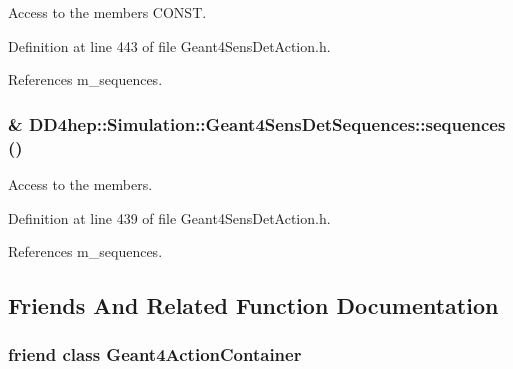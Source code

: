 Access to the members CONST. 

Definition at line 443 of file Geant4SensDetAction.h.

References m\_\-sequences.\hypertarget{class_d_d4hep_1_1_simulation_1_1_geant4_sens_det_sequences_a40e7646be1758328d5bf58213b320bf9}{
\subsubsection[{sequences}]{\& DD4hep::Simulation::Geant4SensDetSequences::sequences ()}}
\label{class_d_d4hep_1_1_simulation_1_1_geant4_sens_det_sequences_a40e7646be1758328d5bf58213b320bf9}


Access to the members. 

Definition at line 439 of file Geant4SensDetAction.h.

References m\_\-sequences.

\subsection{Friends And Related Function Documentation}
\hypertarget{class_d_d4hep_1_1_simulation_1_1_geant4_sens_det_sequences_a17a3e017d1d61a4f615d4e8eef0f98cb}{
\subsubsection[{Geant4ActionContainer}]{\setlength{\rightskip}{0pt plus 5cm}friend class {\bf Geant4ActionContainer}}}
\label{class_d_d4hep_1_1_simulation_1_1_geant4_sens_det_sequences_a17a3e017d1d61a4f615d4e8eef0f98cb}


